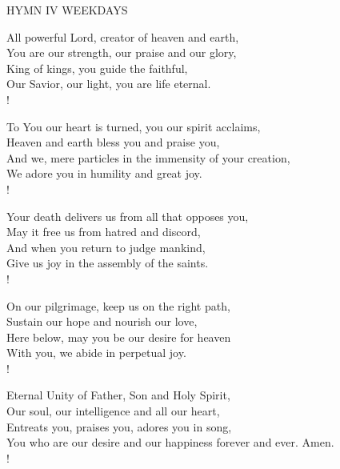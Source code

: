 \noindent\small{\uppercase{Hymn IV WEEKDAYS}}\normalsize\label{ordinaryTime:fourthHymn}
\begin{cverse}
All powerful Lord, creator of heaven and earth,\\
You are our strength, our praise and our glory,\\
King of kings, you guide the faithful,\\
Our Savior, our light, you are life eternal.\\!

To You our heart is turned, you our spirit acclaims,\\
Heaven and earth bless you and praise you,\\
And we, mere particles in the immensity of your creation,\\
We adore you in humility and great joy.\\!

Your death delivers us from all that opposes you,\\
May it free us from hatred and discord,\\
And when you return to judge mankind,\\
Give us joy in the assembly of the saints.\\!

On our pilgrimage, keep us on the right path,\\
Sustain our hope and nourish our love,\\
Here below, may you be our desire for heaven\\
With you, we abide in perpetual joy.\\!

Eternal Unity of Father, Son and Holy Spirit,\\
Our soul, our intelligence and all our heart,\\
Entreats you, praises you, adores you in song,\\
You who are our desire and our happiness forever and ever. Amen.\\!
\end{cverse}

